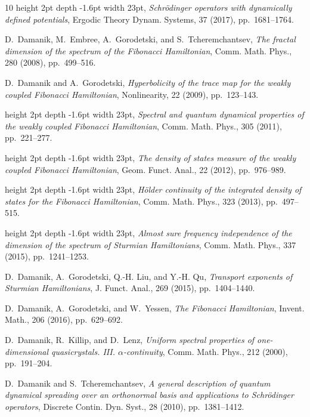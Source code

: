 \documentclass[reqno,11pt,graphicx,]{amsart}
\numberwithin{equation}{section}
\theoremstyle{plain}
\newcommand{\3}{\mathbf{3}}
\begin{document}
\begin{thebibliography}{10}
\leavevmode\vrule height 2pt depth -1.6pt width 23pt, {\em Schr\"{o}dinger
  operators with dynamically defined potentials}, Ergodic Theory Dynam.
  Systems, 37 (2017), pp.~1681--1764.

{\sc D.~Damanik, M.~Embree, A.~Gorodetski, and S.~Tcheremchantsev}, {\em The
  fractal dimension of the spectrum of the {F}ibonacci {H}amiltonian}, Comm.
  Math. Phys., 280 (2008), pp.~499--516.

{\sc D.~Damanik and A.~Gorodetski}, {\em Hyperbolicity of the trace map for the
  weakly coupled {F}ibonacci {H}amiltonian}, Nonlinearity, 22 (2009),
  pp.~123--143.

\leavevmode\vrule height 2pt depth -1.6pt width 23pt, {\em Spectral and quantum
  dynamical properties of the weakly coupled {F}ibonacci {H}amiltonian}, Comm.
  Math. Phys., 305 (2011), pp.~221--277.

\leavevmode\vrule height 2pt depth -1.6pt width 23pt, {\em The density of
  states measure of the weakly coupled {F}ibonacci {H}amiltonian}, Geom. Funct.
  Anal., 22 (2012), pp.~976--989.

\leavevmode\vrule height 2pt depth -1.6pt width 23pt, {\em H\"older continuity
  of the integrated density of states for the {F}ibonacci {H}amiltonian}, Comm.
  Math. Phys., 323 (2013), pp.~497--515.

\leavevmode\vrule height 2pt depth -1.6pt width 23pt, {\em Almost sure
  frequency independence of the dimension of the spectrum of {S}turmian
  {H}amiltonians}, Comm. Math. Phys., 337 (2015), pp.~1241--1253.

{\sc D.~Damanik, A.~Gorodetski, Q.-H. Liu, and Y.-H. Qu}, {\em Transport
  exponents of {S}turmian {H}amiltonians}, J. Funct. Anal., 269 (2015),
  pp.~1404--1440.

{\sc D.~Damanik, A.~Gorodetski, and W.~Yessen}, {\em The {F}ibonacci
  {H}amiltonian}, Invent. Math., 206 (2016), pp.~629--692.

{\sc D.~Damanik, R.~Killip, and D.~Lenz}, {\em Uniform spectral properties of
  one-dimensional quasicrystals. {III}. {$\alpha$}-continuity}, Comm. Math.
  Phys., 212 (2000), pp.~191--204.

{\sc D.~Damanik and S.~Tcheremchantsev}, {\em A general description of quantum
  dynamical spreading over an orthonormal basis and applications to
  {S}chr\"{o}dinger operators}, Discrete Contin. Dyn. Syst., 28 (2010),
  pp.~1381--1412.


\end{thebibliography}
\end{document}
